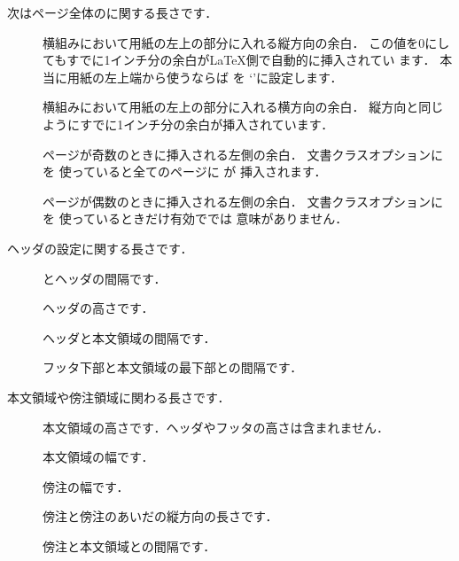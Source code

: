 次はページ全体のに関する長さです．
\begin{description}
 \item[] 
 横組みにおいて用紙の左上の部分に入れる縦方向の余白．
 この値を0にしてもすでに1インチ分の余白が\LaTeX 側で自動的に挿入されてい
  ます．
 本当に用紙の左上端から使うならば を `\str{-1in}'に設定します．

 \item[] 
 横組みにおいて用紙の左上の部分に入れる横方向の余白．
 縦方向と同じようにすでに1インチ分の余白が挿入されています．

 \item[]
ページが奇数のときに挿入される左側の余白．
文書クラスオプションにを
使っていると全てのページに が
挿入されます．

 \item[] 
ページが偶数のときに挿入される左側の余白．
文書クラスオプションにを
使っているときだけ有効ででは
意味がありません．
\end{description}

ヘッダの設定に関する長さです．
\begin{description}
\item[] 
とヘッダの間隔です．
\item[]
ヘッダの高さです．%
\item[]
ヘッダと本文領域の間隔です．
\item[]
フッタ下部と本文領域の最下部との間隔です．
\end{description}

本文領域や傍注領域に関わる長さです．
\begin{description}
\item[]%
 本文領域の高さです．ヘッダやフッタの高さは含まれません．
 \item[]
 本文領域の幅です．%
 \item[]
  傍注の幅です．%
 \item[]
 傍注と傍注のあいだの縦方向の長さです．
 \item[]
 傍注と本文領域との間隔です．
\end{description}


